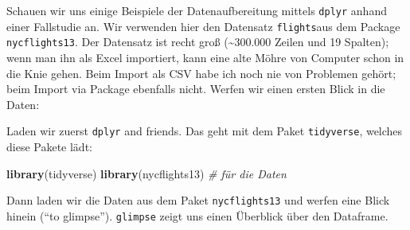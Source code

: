 \documentclass[12pt,ngerman,]{book}
\newenvironment{Shaded}{\begin{snugshade}}{\end{snugshade}}
\newcommand{\KeywordTok}[1]{\textcolor[rgb]{0.13,0.29,0.53}{\textbf{{#1}}}}
\newcommand{\CommentTok}[1]{\textcolor[rgb]{0.56,0.35,0.01}{\textit{{#1}}}}
\newcommand{\NormalTok}[1]{{#1}}
\renewenvironment{Shaded}{\begin{kframe}}{\end{kframe}}
\begin{document}
Schauen wir uns einige Beispiele der Datenaufbereitung mittels
\texttt{dplyr} anhand einer Fallstudie an. Wir verwenden hier den
Datensatz \texttt{flights}aus dem Package \texttt{nycflights13}. Der
Datensatz ist recht groß (\textasciitilde{}300.000 Zeilen und 19
Spalten); wenn man ihn als Excel importiert, kann eine alte Möhre von
Computer schon in die Knie gehen. Beim Import als CSV habe ich noch nie
von Problemen gehört; beim Import via Package ebenfalls nicht. Werfen
wir einen ersten Blick in die Daten:

Laden wir zuerst \texttt{dplyr} and friends. Das geht mit dem Paket
\texttt{tidyverse}, welches diese Pakete lädt:

\begin{Shaded}
\begin{Highlighting}[]
\KeywordTok{library}\NormalTok{(tidyverse)}
\KeywordTok{library}\NormalTok{(nycflights13)  }\CommentTok{# für die Daten}
\end{Highlighting}
\end{Shaded}

Dann laden wir die Daten aus dem Paket \texttt{nycflights13} und werfen
eine Blick hinein (``to glimpse''). \texttt{glimpse} zeigt uns einen
Überblick über den Dataframe.
\end{document}
